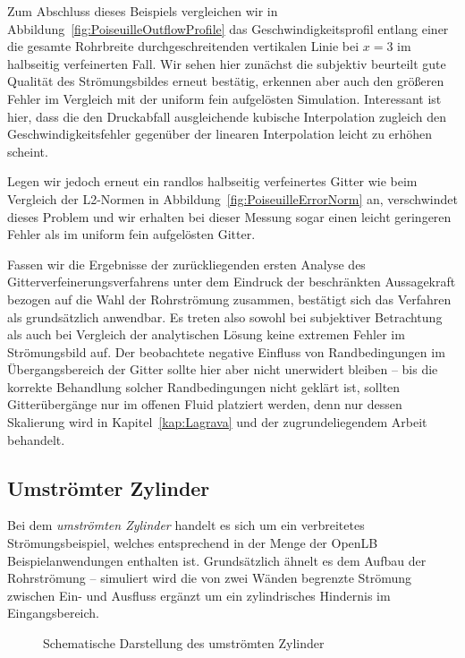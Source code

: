 Zum Abschluss dieses Beispiels vergleichen wir in Abbildung~\ref{fig:PoiseuilleOutflowProfile} das Geschwindigkeitsprofil entlang einer die gesamte Rohrbreite durchgeschreitenden vertikalen Linie bei \(x=3\) im halbseitig verfeinerten Fall. Wir sehen hier zunächst die subjektiv beurteilt gute Qualität des Strömungsbildes erneut bestätig, erkennen aber auch den größeren Fehler im Vergleich mit der uniform fein aufgelösten Simulation. Interessant ist hier, dass die den Druckabfall ausgleichende kubische Interpolation zugleich den Geschwindigkeitsfehler gegenüber der linearen Interpolation leicht zu erhöhen scheint.

Legen wir jedoch erneut ein randlos halbseitig verfeinertes Gitter wie beim Vergleich der L2-Normen in Abbildung~\ref{fig:PoiseuilleErrorNorm} an, verschwindet dieses Problem und wir erhalten bei dieser Messung sogar einen leicht geringeren Fehler als im uniform fein aufgelösten Gitter.

\bigskip

Fassen wir die Ergebnisse der zurückliegenden ersten Analyse des Gitterverfeinerungsverfahrens unter dem Eindruck der beschränkten Aussagekraft bezogen auf die Wahl der Rohrströmung zusammen, bestätigt sich das Verfahren als grundsätzlich anwendbar. Es treten also sowohl bei subjektiver Betrachtung als auch bei Vergleich der analytischen Lösung keine extremen Fehler im Strömungsbild auf. Der beobachtete negative Einfluss von Randbedingungen im Übergangsbereich der Gitter sollte hier aber nicht unerwidert bleiben -- bis die korrekte Behandlung solcher Randbedingungen nicht geklärt ist, sollten Gitterübergänge nur im offenen Fluid platziert werden, denn nur dessen Skalierung wird in Kapitel~\ref{kap:Lagrava} und der zugrundeliegendem Arbeit \cite{Lagrava12} behandelt.

\newpage
\subsection{Umströmter Zylinder}

Bei dem \emph{umströmten Zylinder} handelt es sich um ein verbreitetes Strömungsbeispiel, welches entsprechend in der Menge der OpenLB Beispielanwendungen enthalten ist. Grundsätzlich ähnelt es dem Aufbau der Rohrströmung -- simuliert wird die von zwei Wänden begrenzte Strömung zwischen Ein- und Ausfluss ergänzt um ein zylindrisches Hindernis im Eingangsbereich.

\begin{figure}[h]
\centering

\caption{Schematische Darstellung des umströmten Zylinder \cite[vgl.~Abb.~1]{SchaeferTurek96}}
\label{fig:cylinder2d_overview}
\end{figure}

